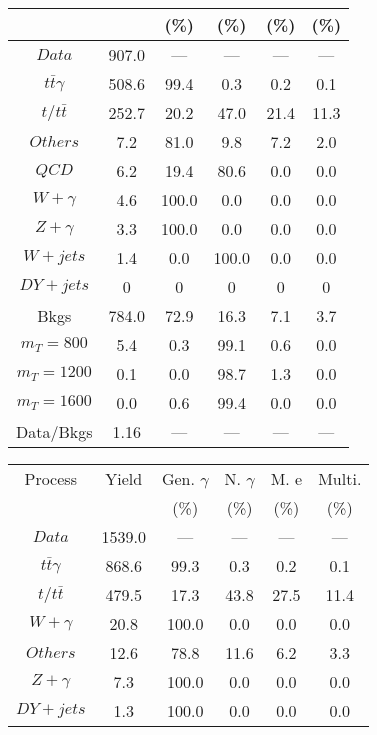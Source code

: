 \begin{figure}
\begin{minipage}[c]{0.32\textwidth}
{\begin{tabular}{cccccc}
 &  & (\%) & (\%) & (\%) & (\%)  \\
\hline
                                                                      $ Data $ &  907.0 &  --- &  --- &  --- &  ---\\
$ t\bar{t}\gamma $ &  508.6 &  99.4 &  0.3 &  0.2 &  0.1\\
$ t/t\bar{t} $ &  252.7 &  20.2 &  47.0 &  21.4 &  11.3\\
$ Others $ &  7.2 &  81.0 &  9.8 &  7.2 &  2.0\\
$ QCD $ &  6.2 &  19.4 &  80.6 &  0.0 &  0.0\\
$ W+\gamma $ &  4.6 &  100.0 &  0.0 &  0.0 &  0.0\\
$ Z+\gamma $ &  3.3 &  100.0 &  0.0 &  0.0 &  0.0\\
$ W+jets $ &  1.4 &  0.0 &  100.0 &  0.0 &  0.0\\
$ DY+jets $ &  0 &  0 &  0 &  0 &  0\\
Bkgs &  784.0 &  72.9 &  16.3 &  7.1 &  3.7\\
$ m_{T} = 800 $ &  5.4 &  0.3 &  99.1 &  0.6 &  0.0\\
$ m_{T} = 1200 $ &  0.1 &  0.0 &  98.7 &  1.3 &  0.0\\
$ m_{T} = 1600 $ &  0.0 &  0.6 &  99.4 &  0.0 &  0.0\\
Data/Bkgs &  1.16 &  --- &  --- &  --- &  ---\\
\hline
\end{tabular}
}
\end{minipage}
\begin{minipage}[c]{0.32\textwidth}
\centering
\tiny{
\begin{tabular}{cccccc}
\hline
Process & Yield & Gen. $\gamma$ & N. $\gamma$ & M. e & Multi. \\
 &  & (\%) & (\%) & (\%) & (\%)  \\
\hline
                                                                      $ Data $ &  1539.0 &  --- &  --- &  --- &  ---\\
$ t\bar{t}\gamma $ &  868.6 &  99.3 &  0.3 &  0.2 &  0.1\\
$ t/t\bar{t} $ &  479.5 &  17.3 &  43.8 &  27.5 &  11.4\\
$ W+\gamma $ &  20.8 &  100.0 &  0.0 &  0.0 &  0.0\\
$ Others $ &  12.6 &  78.8 &  11.6 &  6.2 &  3.3\\
$ Z+\gamma $ &  7.3 &  100.0 &  0.0 &  0.0 &  0.0\\
$ DY+jets $ &  1.3 &  100.0 &  0.0 &  0.0 &  0.0\\

\end{tabular}}
\end{minipage}
\end{figure}
